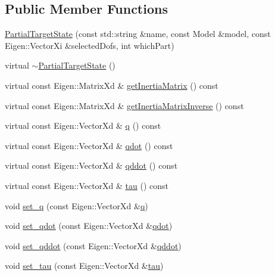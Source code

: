 \subsection*{Public Member Functions}
\begin{DoxyCompactItemize}
\item 
\hyperlink{classocra_1_1PartialTargetState_a2aed8d7e02fa12907eb218449afc6422}{Partial\+Target\+State} (const std\+::string \&name, const Model \&model, const Eigen\+::\+Vector\+Xi \&selected\+Dofs, int which\+Part)
\item 
virtual \hyperlink{classocra_1_1PartialTargetState_a32d63501a917b40728387258cb1e06d1}{$\sim$\+Partial\+Target\+State} ()
\item 
virtual const Eigen\+::\+Matrix\+Xd \& \hyperlink{classocra_1_1PartialTargetState_a757cd49fca47e934025e92b81dc15535}{get\+Inertia\+Matrix} () const
\item 
virtual const Eigen\+::\+Matrix\+Xd \& \hyperlink{classocra_1_1PartialTargetState_a0e6f90f112e0a54384eb99dd7def49e0}{get\+Inertia\+Matrix\+Inverse} () const
\item 
virtual const Eigen\+::\+Vector\+Xd \& \hyperlink{classocra_1_1PartialTargetState_af953d48bac74ff93ed79d4c75bde207f}{q} () const
\item 
virtual const Eigen\+::\+Vector\+Xd \& \hyperlink{classocra_1_1PartialTargetState_a9442a4f1c0827a20b6d6582dcceff88a}{qdot} () const
\item 
virtual const Eigen\+::\+Vector\+Xd \& \hyperlink{classocra_1_1PartialTargetState_a450c270ee9583ad7cde6a91630045792}{qddot} () const
\item 
virtual const Eigen\+::\+Vector\+Xd \& \hyperlink{classocra_1_1PartialTargetState_ac76855da54cf77b63bdbd7ecdb6ef57d}{tau} () const
\item 
void \hyperlink{classocra_1_1PartialTargetState_aa1cf1348c8e9880897df5f7f925dcac5}{set\+\_\+q} (const Eigen\+::\+Vector\+Xd \&\hyperlink{classocra_1_1PartialTargetState_af953d48bac74ff93ed79d4c75bde207f}{q})
\item 
void \hyperlink{classocra_1_1PartialTargetState_af04d90592c43ee69ed14e212e7fa2f47}{set\+\_\+qdot} (const Eigen\+::\+Vector\+Xd \&\hyperlink{classocra_1_1PartialTargetState_a9442a4f1c0827a20b6d6582dcceff88a}{qdot})
\item 
void \hyperlink{classocra_1_1PartialTargetState_a4acfcf9b591e296d56c91e00bdbd2a69}{set\+\_\+qddot} (const Eigen\+::\+Vector\+Xd \&\hyperlink{classocra_1_1PartialTargetState_a450c270ee9583ad7cde6a91630045792}{qddot})
\item 
void \hyperlink{classocra_1_1PartialTargetState_a3c58ea195fb95e9a5a5e7a00939f955d}{set\+\_\+tau} (const Eigen\+::\+Vector\+Xd \&\hyperlink{classocra_1_1PartialTargetState_ac76855da54cf77b63bdbd7ecdb6ef57d}{tau})
\end{DoxyCompactItemize}
